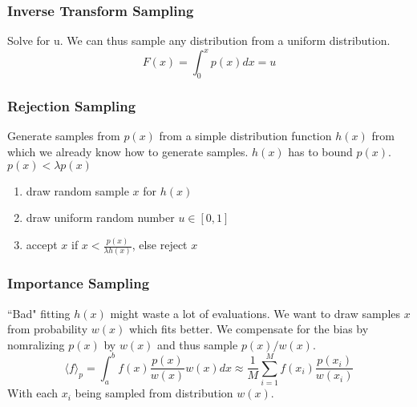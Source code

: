     \subsubsection{Inverse Transform Sampling}
        Solve for u. We can thus sample any distribution from a uniform distribution.
        \begin{equation*}
            F(x) = \int_0^x p(x)dx = u
        \end{equation*}
    
    \subsubsection{Rejection Sampling}
        Generate samples from $p(x)$ from a simple distribution function $h(x)$ from which we already know how to generate samples. $h(x)$ has to bound $p(x)$. $p(x) < \lambda p(x)$
        \begin{enumerate}
            \item draw random sample $x$ for $h(x)$
            \item draw uniform random number $u\in[0,1]$
            \item accept $x$ if $x < \frac{p(x)}{\lambda h(x)}$, else reject $x$
        \end{enumerate}
    
    \subsubsection{Importance Sampling}
        ``Bad" fitting $h(x)$ might waste a lot of evaluations. We want to draw samples $x$ from probability $w(x)$ which fits better. We compensate for the bias by nomralizing $p(x)$ by $w(x)$ and thus sample $p(x)/w(x)$.
        \begin{equation*}
            \langle f \rangle_p = \int_a^b f(x)\frac{p(x)}{w(x)}w(x)dx \approx \frac{1}{M}\sum_{i=1}^M f(x_i)\frac{p(x_i)}{w(x_i)}
        \end{equation*}
        With each $x_i$ being sampled from distribution $w(x)$.
    
